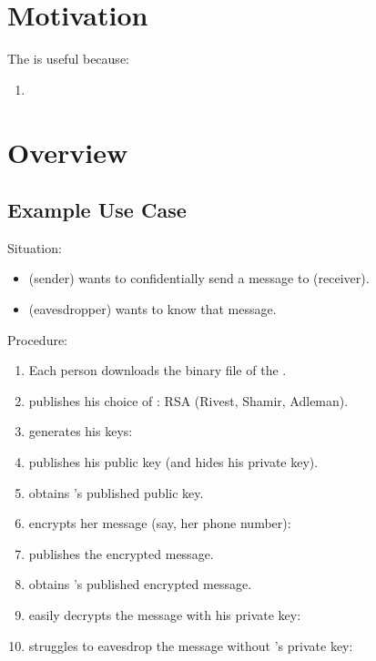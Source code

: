\documentclass[11pt]{extarticle}
\title{\deliv{\pp}{Report}}
\author{\names}
\date{2017-01-29}
\begin{document}
\maketitle
\tableofcontents
\thispagestyle{fancy}

\begin{flushleft}


\section{Motivation}

The \cry{} \cf{} is useful because:
\begin{enumerate}
  \item
\end{enumerate}


\section{Overview}


\subsection{Example Use Case}

Situation:
\begin{itemize}
\item
  \alice{} (sender) wants to confidentially send a message
  to \bob{} (receiver).
\item
  \eve{} (eavesdropper) wants to know that message.
\end{itemize}

Procedure:
\begin{enumerate}
\item
  Each person downloads the binary file 
  of the \cry{} \cf.
\item
  \bob{} publishes his choice of \cs:
  RSA (Rivest, Shamir, Adleman).
\item
  \bob{} generates his keys: \getkeysex
\item
  \bob{} publishes his public key
  (and hides his private key).
\item
  \alice{} obtains \bob's published public key.
\item
  \alice{} encrypts her message (say, her phone number):
  \encryptex
\item
  \alice{} publishes the encrypted message.
\item
  \bob{} obtains \alice's published encrypted message.
\item
  \bob{} easily decrypts the message with his private key:
  \decryptex
\item
  \eve{} struggles to eavesdrop the message
  without \bob's private key: \eavesdropex
\end{enumerate}


\end{flushleft}
\end{document}
